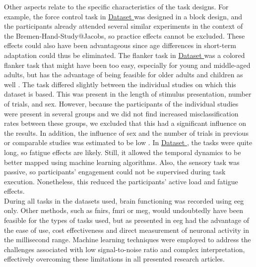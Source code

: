 Other aspects relate to the specific characteristics of the task designs. For example, the force control task in \hyperref[methods:datasets:I]{Dataset } was designed in a block design, and the participants already attended several similar experiments in the context of the Bremen-Hand-Study@Jacobs, so practice effects cannot be excluded. These effects could also have been advantageous since age differences in short-term adaptation could thus be eliminated. The flanker task in \hyperref[methods:datasets:II]{Dataset } was a colored flanker task that might have been too easy, especially for young and middle-aged adults, but has the advantage of being feasible for older adults and children as well \cite{Reuter2019}. The task differed slightly between the individual studies on which this dataset is based. This was present in the length of stimulus presentation, number of trials, and sex. However, because the participants of the individual studies were present in several groups and we did not find increased misclassification rates between these groups, we excluded that this had a significant influence on the results. In addition, the influence of sex and the number of trials in previous or comparable studies was estimated to be low \cite{Reuter2019, Vahid2020}. In \hyperref[methods:datasets:III]{Dataset }, the tasks were quite long, so fatigue effects are likely. Still, it allowed the temporal dynamics to be better mapped using machine learning algorithms. Also, the sensory task was passive, so participants' engagement could not be supervised during task execution. Nonetheless, this reduced the participants' active load and fatigue effects.\\
During all tasks in the datasets used, brain functioning was recorded using \gls{eeg} only. Other methods, such as \gls{fnirs}, \gls{fmri} or \gls{meg}, would undoubtedly have been feasible for the types of tasks used, but as presented in  \gls{eeg} had the advantage of the ease of use, cost effectiveness and direct measurement of neuronal activity in the millisecond range. Machine learning techniques were employed to address the challenges associated with low signal-to-noise ratio and complex interpretation, effectively overcoming these limitations in all presented research articles.


